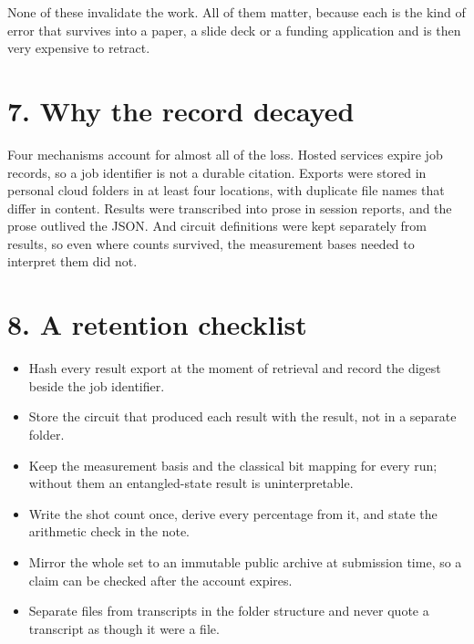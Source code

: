 \documentclass[11pt]{article}
\begin{document}
None of these invalidate the work. All of them matter, because each is the kind of error that survives into a paper, a slide deck or a funding application and is then very expensive to retract.

\section*{7. Why the record decayed}
Four mechanisms account for almost all of the loss. Hosted services expire job records, so a job identifier is not a durable citation. Exports were stored in personal cloud folders in at least four locations, with duplicate file names that differ in content. Results were transcribed into prose in session reports, and the prose outlived the JSON. And circuit definitions were kept separately from results, so even where counts survived, the measurement bases needed to interpret them did not.

\section*{8. A retention checklist}
\begin{itemize}\item Hash every result export at the moment of retrieval and record the digest beside the job identifier.\end{itemize}
\begin{itemize}\item Store the circuit that produced each result with the result, not in a separate folder.\end{itemize}
\begin{itemize}\item Keep the measurement basis and the classical bit mapping for every run; without them an entangled-state result is uninterpretable.\end{itemize}
\begin{itemize}\item Write the shot count once, derive every percentage from it, and state the arithmetic check in the note.\end{itemize}
\begin{itemize}\item Mirror the whole set to an immutable public archive at submission time, so a claim can be checked after the account expires.\end{itemize}
\begin{itemize}\item Separate files from transcripts in the folder structure and never quote a transcript as though it were a file.\end{itemize}
\end{document}
